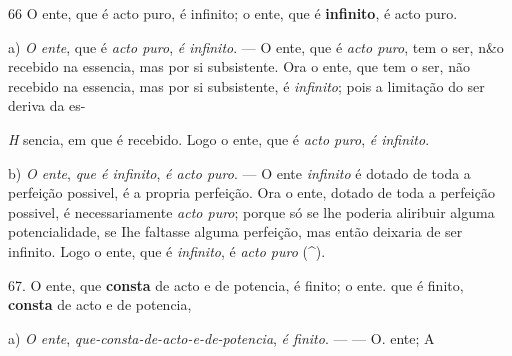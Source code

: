  66 O ente, que é acto puro, é infinito; o ente, que é \textbf{infinito}, é acto puro.

a) \emph{O ente}, que é \emph{acto puro}, \emph{é infinito}. --- O ente, que é \emph{acto puro}, tem o ser, n\&o recebido na essencia, mas por si subsistente. Ora o ente, que tem o ser, não recebido na essencia, mas por si subsistente, é \emph{infinito}; pois a limitação do ser deriva da es-

\emph{H} sencia, em que é recebido. Logo o ente, que é \emph{acto puro}, \emph{é infinito}.

b) \emph{O ente}, \emph{que é infinito}, \emph{é acto puro}. --- O ente \emph{infinito} é dotado de toda a perfeição possivel, é a propria perfeição. Ora o ente, dotado de toda a perfeição possivel, é necessariamente \emph{acto puro}; porque só se lhe poderia aliribuir alguma potencialidade, se Ihe faltasse alguma perfeição, mas então deixaria de ser infinito. Logo o ente, que é \emph{infinito}, é \emph{acto puro} (\textasciicircum{}).

67. O ente, que \textbf{consta} de acto e de potencia, é finito; o ente. que é finito, \textbf{consta} de acto e de potencia,

a) \emph{O ente}, \emph{que-consta-de-acto-e-de-potencia}, \emph{é finito}. --- --- O. ente; A


